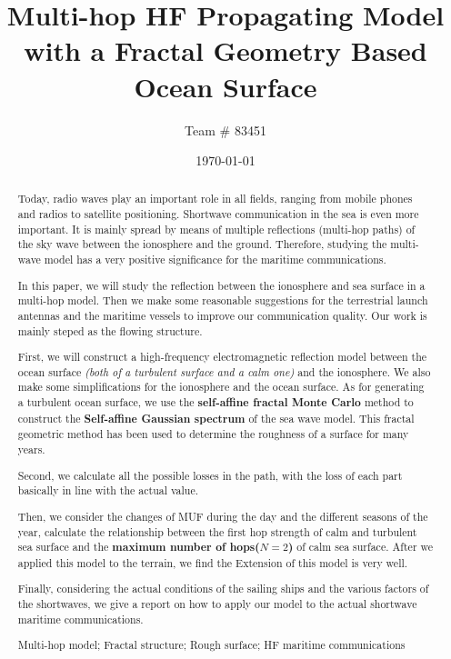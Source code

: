 \documentclass{mcmthesis}
\title{ Multi-hop HF Propagating Model with a Fractal Geometry Based Ocean Surface}
\author{\small Team \# 83451}
\date{\today}
\begin{document}
\begin{abstract}

Today, radio waves play an important role in all fields, ranging from mobile phones and radios to satellite positioning. Shortwave communication in the sea is even more important. It is mainly spread by means of multiple reflections (multi-hop paths) of the sky wave between the ionosphere and the ground. Therefore, studying the multi-wave model has a very positive significance for the maritime communications.

In this paper, we will study the reflection between the ionosphere and sea surface in a multi-hop model. Then we make some reasonable suggestions for the terrestrial launch antennas and the maritime vessels to improve our communication quality. Our work is mainly steped as the flowing structure.

First, we will construct a high-frequency electromagnetic reflection model between the ocean surface \emph{(both of a turbulent surface and a calm one)} and the ionosphere. We also make some simplifications for the ionosphere and the ocean surface. As for generating a turbulent ocean surface, we use the \textbf{self-affine fractal Monte Carlo} method to construct the \textbf{Self-affine Gaussian spectrum} of the sea wave model. This fractal geometric method has been used to determine the roughness of a surface for many years.

Second, we calculate all the possible losses in the path, with the loss of each part basically in line with the actual value.

Then, we consider the changes of MUF during the day and the different seasons of the year, calculate the relationship between the first hop strength of calm and turbulent sea surface and the \textbf{maximum number of hops($N=2$)} of calm sea surface. After we applied this model to the terrain, we find the Extension of this model is very well.

Finally, considering the actual conditions of the sailing ships and the various factors of the shortwaves, we give a report on how to apply our model to the actual shortwave maritime communications.

\begin{keywords}
  Multi-hop model; Fractal structure; Rough surface; HF maritime communications
\end{keywords}
\end{abstract}
\maketitle
\end{document}
